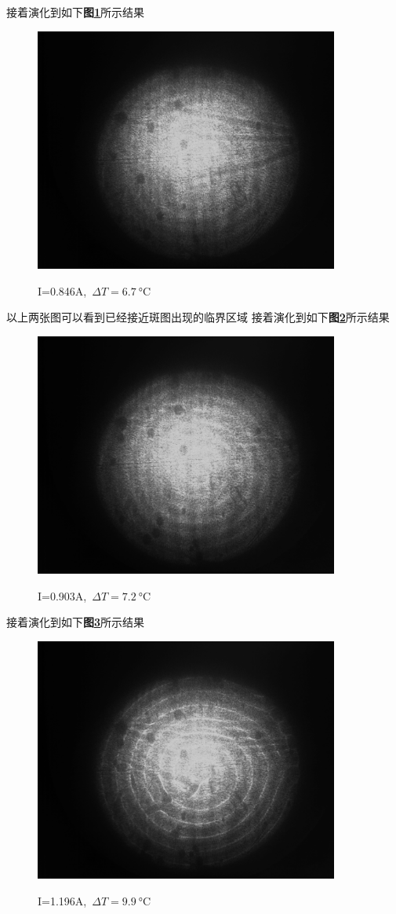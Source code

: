 \documentclass[a4paper]{article}
\begin{document}
接着演化到如下\textbf{图\ref{result:fig6}}所示结果
\begin{figure}[H]
 \centering
 \caption{I=0.846A,\ $\Delta T=\SI{6.7}{\celsius}$}
 \includegraphics[height=8cm, width=10cm]{images/31.0_37.7_0.846_4.36.bmp}
 \label{result:fig6}
\end{figure}
以上两张图可以看到已经接近斑图出现的临界区域
\newpage
接着演化到如下\textbf{图\ref{result:fig7}}所示结果
\begin{figure}[H]
 \centering
 \caption{I=0.903A,\ $\Delta T=\SI{7.2}{\celsius}$}
 \includegraphics[height=8cm, width=10cm]{images/31.8_39.0_0.903_4.47.bmp}
 \label{result:fig7}
\end{figure}
接着演化到如下\textbf{图\ref{result:fig8}}所示结果
\begin{figure}[H]
 \centering
 \caption{I=1.196A,\ $\Delta T=\SI{9.9}{\celsius}$}
 \includegraphics[height=8cm, width=10cm]{images/34.6_44.5_1.196_5.00.bmp}
 \label{result:fig8}
\end{figure}
\end{document}
